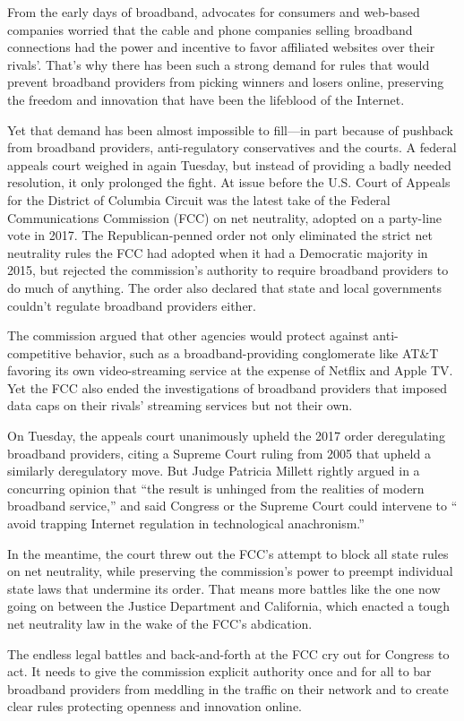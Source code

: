 From the early days of broadband, advocates for consumers and web-based companies worried that the cable and phone companies selling broadband connections had the power and incentive to favor affiliated websites over their rivals'. That's why there has been such a strong demand for rules that would prevent broadband providers from picking winners and losers online, preserving the freedom and innovation that have been the lifeblood of the Internet.


Yet that demand has been almost impossible to fill—in part because of pushback from broadband providers, anti-regulatory conservatives and the courts. A federal appeals court weighed in again Tuesday, but instead of providing a badly needed resolution, it only prolonged the fight. At issue before the U.S. Court of Appeals for the District of Columbia Circuit was the latest take of the Federal Communications Commission (FCC) on net neutrality, adopted on a party-line vote in 2017. The Republican-penned order not only eliminated the strict net neutrality rules the FCC had adopted when it had a Democratic majority in 2015, but rejected the commission's authority to require broadband providers to do much of anything. The order also declared that state and local governments couldn't regulate broadband providers either.


The commission argued that other agencies would protect against anti-competitive behavior, such as a broadband-providing conglomerate like AT\&T favoring its own video-streaming service at the expense of Netflix and Apple TV. Yet the FCC also ended the investigations of broadband providers that imposed data caps on their rivals' streaming services but not their own.


On Tuesday, the appeals court unanimously upheld the 2017 order deregulating broadband providers, citing a Supreme Court ruling from 2005 that upheld a similarly deregulatory move. But Judge Patricia Millett rightly argued in a concurring opinion that ``the result is unhinged from the realities of modern broadband service,'' and said Congress or the Supreme Court could intervene to `` avoid trapping Internet regulation in technological anachronism.''


In the meantime, the court threw out the FCC's attempt to block all state rules on net neutrality, while preserving the commission's power to preempt individual state laws that undermine its order. That means more battles like the one now going on between the Justice Department and California, which enacted a tough net neutrality law in the wake of the FCC's abdication.


The endless legal battles and back-and-forth at the FCC cry out for Congress to act. It needs to give the commission explicit authority once and for all to bar broadband providers from meddling in the traffic on their network and to create clear rules protecting openness and innovation online.